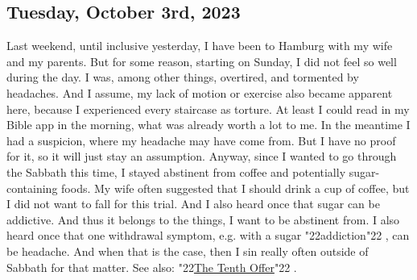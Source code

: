 \documentclass[12pt,a4paper]{article}
\newcommand{\q}[1]{\char"22{#1}\char"22 }
\begin{document}
	\subsection{Tuesday, October 3rd, 2023}
		Last weekend,
		until inclusive yesterday,
		I have been to Hamburg with my wife and my parents.
		But for some reason,
		starting on Sunday,
		I did not feel so well during the day.
		I was,
		among other things,
		overtired,
		and tormented by headaches.
		And I assume,
		my lack of motion or exercise also became apparent here,
		because I experienced every staircase as torture.
		At least I could read in my Bible app in the morning,
		what was already worth a lot to me.
		In the meantime I had a suspicion,
		where my headache may have come from.
		But I have no proof for it,
		so it will just stay an assumption.
		Anyway,
		since I wanted to go through the Sabbath this time,
		I stayed abstinent from coffee and potentially sugar-containing foods.
		My wife often suggested that I should drink a cup of coffee,
		but I did not want to fall for this trial.
		And I also heard once that sugar can be addictive.
		And thus it belongs to the things,
		I want to be abstinent from.
		I also heard once that one withdrawal symptom,
		e.g. with a sugar \q{addiction},
		can be headache.
		And when that is the case,
		then I sin really often outside of Sabbath for that matter.
		See also: \q{\hyperref[TheTenthOffer]{The Tenth Offer}}.
\end{document}
